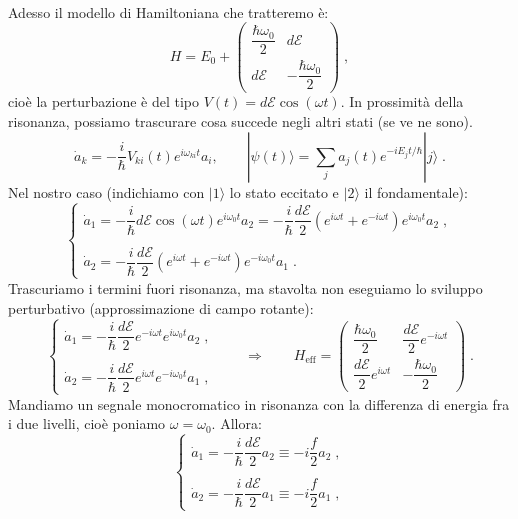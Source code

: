 \documentclass[12pt,a4paper]{report}
\theoremstyle{definition}
\numberwithin{equation}{section}
\newcommand{\ket}{\rangle}
\begin{document}
\\
Adesso il modello di Hamiltoniana che tratteremo è:
\begin{equation}
H=E_0+\left(\begin{matrix}
\dfrac{\hbar\omega_0}{2} & d\mathcal{E} \\
d\mathcal{E} & -\dfrac{\hbar\omega_0}{2}
\end{matrix}\right)\;,
\end{equation}
cioè la perturbazione è del tipo $V(t)=d\mathcal{E}\cos(\omega t)$. In prossimità della risonanza, possiamo trascurare cosa succede negli altri stati (se ve ne sono).
\begin{equation}
\dot{a}_k=-\frac{i}{\hbar}V_{ki}(t)e^{i\omega_{ki}t}a_i,\qquad |\psi(t)\ket=\sum_ja_j(t)e^{-iE_jt/\hbar}|j\ket\;.
\end{equation}
Nel nostro caso (indichiamo con $|1\ket$ lo stato eccitato e $|2\ket$ il fondamentale):
\begin{equation*}
\begin{cases}
\dot{a}_1=-\dfrac{i}{\hbar}d\mathcal{E}\cos(\omega t) e^{i\omega_0t}a_2=-\dfrac{i}{\hbar}\dfrac{d\mathcal{E}}{2}(e^{i\omega t}+e^{-i\omega t})e^{i\omega_0t}a_2\;, \\
\\
\dot{a}_2=-\dfrac{i}{\hbar}\dfrac{d\mathcal{E}}{2}(e^{i\omega t}+e^{-i\omega t})e^{-i\omega_0t}a_1\;.
\end{cases}
\end{equation*}
Trascuriamo i termini fuori risonanza, ma stavolta non eseguiamo lo sviluppo perturbativo (approssimazione di campo rotante):
\begin{equation}
\begin{cases}
\dot{a}_1=-\dfrac{i}{\hbar}\dfrac{d\mathcal{E}}{2}e^{-i\omega t}e^{i\omega_0t}a_2\;, \\
\\
\dot{a}_2=-\dfrac{i}{\hbar}\dfrac{d\mathcal{E}}{2}e^{i\omega t}e^{-i\omega_0t}a_1\;,
\end{cases}\qquad \Longrightarrow \qquad
H_{\mathrm{eff}}=\left(\begin{matrix}
\dfrac{\hbar\omega_0}{2} & \dfrac{d\mathcal{E}}{2}e^{-i\omega t} \\
\dfrac{d\mathcal{E}}{2}e^{i\omega t} & -\dfrac{\hbar\omega_0}{2}
\end{matrix}\right)\;.
\end{equation}
Mandiamo un segnale monocromatico in risonanza con la differenza di energia fra i due livelli, cioè poniamo $\omega=\omega_0$. Allora:
\begin{equation*}
\begin{cases}
\dot{a}_1 =-\dfrac{i}{\hbar}\dfrac{d\mathcal{E}}{2}a_2\equiv -i\dfrac{f}{2}a_2\;, \\
\\
\dot{a}_2 =-\dfrac{i}{\hbar}\dfrac{d\mathcal{E}}{2}a_1\equiv -i\dfrac{f}{2}a_1\;,
\end{cases}
\end{equation*}
\end{document}
